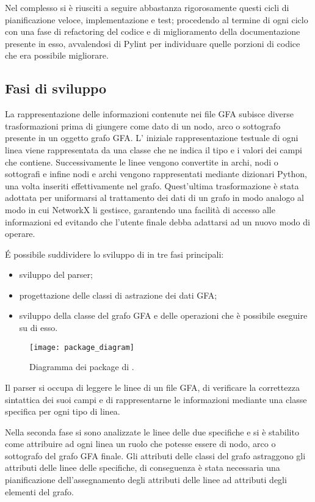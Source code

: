 Nel complesso si è riusciti a seguire abbastanza rigorosamente questi cicli
di pianificazione veloce, implementazione e test; procedendo al termine
di ogni ciclo con una fase di refactoring del codice e di miglioramento
della documentazione presente in esso, avvalendosi di Pylint per individuare
quelle porzioni di codice che era possibile migliorare.

\subsection{Fasi di sviluppo}
La rappresentazione delle informazioni contenute nei file GFA subisce
diverse trasformazioni prima di giungere come dato di un nodo, arco o
sottografo presente in un oggetto grafo GFA. L' iniziale rappresentazione
testuale di ogni linea viene rappresentata da una classe che ne indica
il tipo e i valori dei campi che contiene. Successivamente le linee
vengono convertite in archi, nodi o sottografi e infine nodi e archi
vengono rappresentati mediante dizionari Python, una volta inseriti
effettivamente nel grafo. Quest'ultima trasformazione è stata
adottata per uniformarsi al trattamento dei dati di un grafo in modo analogo
al modo in cui NetworkX li gestisce, garantendo una facilità di accesso
alle informazioni ed evitando che l'utente finale debba adattarsi ad un
nuovo modo di operare.

\'E possibile suddividere lo sviluppo di \pygfa in tre fasi principali:
\begin{itemize}
	\item sviluppo del parser;
	\item progettazione delle classi di astrazione dei dati GFA;
	\item sviluppo della classe del grafo GFA e delle operazioni che è
		possibile eseguire su di esso.
\end{itemize}
\captionsetup{justification=centering}
\begin{figure}[h]
	\centering
	\texttt{[image: package\_diagram]}
	\caption[Diagramma dei package]{Diagramma dei package di \pygfa.}
\end{figure}
\captionsetup{justification=justified}

Il parser si occupa di leggere le linee di un file GFA, di verificare la correttezza
sintattica dei suoi campi e di rappresentarne le informazioni mediante una classe
specifica per ogni tipo di linea.

Nella seconda fase si sono analizzate le linee delle due specifiche e si
è stabilito come attribuire ad ogni linea un ruolo che potesse essere di
nodo, arco o sottografo del grafo GFA finale. Gli attributi delle classi
del grafo astraggono gli attributi delle linee delle specifiche, 
di conseguenza è stata necessaria
una pianificazione dell'assegnamento degli attributi delle linee ad
attributi degli elementi del grafo.

